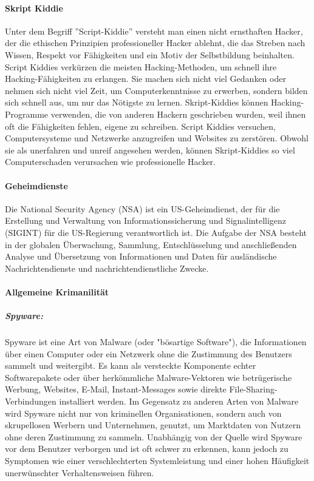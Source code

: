 \paragraph{Skript Kiddie}\mbox{}

Unter dem Begriff ''Script-Kiddie'' versteht man einen nicht ernsthaften Hacker, der die ethischen Prinzipien professioneller Hacker ablehnt, die das Streben nach Wissen, Respekt vor Fähigkeiten und ein Motiv der Selbstbildung beinhalten. Script Kiddies verkürzen die meisten Hacking-Methoden, um schnell ihre Hacking-Fähigkeiten zu erlangen. Sie machen sich nicht viel Gedanken oder nehmen sich nicht viel Zeit, um Computerkenntnisse zu erwerben, sondern bilden sich schnell aus, um nur das Nötigste zu lernen. Skript-Kiddies können Hacking-Programme verwenden, die von anderen Hackern geschrieben wurden, weil ihnen oft die Fähigkeiten fehlen, eigene zu schreiben. Script Kiddies versuchen, Computersysteme und Netzwerke anzugreifen und Websites zu zerstören. Obwohl sie als unerfahren und unreif angesehen werden, können Skript-Kiddies so viel Computerschaden verursachen wie professionelle Hacker\cite{scriptkiddie11}.

\paragraph{Geheimdienste}\mbox{}

Die National Security Agency (NSA) ist ein US-Geheimdienst, der für die Erstellung und Verwaltung von Informationssicherung und Signalintelligenz (SIGINT) für die US-Regierung verantwortlich ist. Die Aufgabe der NSA besteht in der globalen Überwachung, Sammlung, Entschlüsselung und anschließenden Analyse und Übersetzung von Informationen und Daten für ausländische Nachrichtendienste und nachrichtendienstliche Zwecke\cite{nsa14}.

\paragraph{Allgemeine Krimanilität}\mbox{}

\subparagraph{Spyware: }

Spyware ist eine Art von Malware (oder "bösartige Software"), die Informationen über einen Computer oder ein Netzwerk ohne die Zustimmung des Benutzers sammelt und weitergibt. Es kann als versteckte Komponente echter Softwarepakete oder über herkömmliche Malware-Vektoren wie betrügerische Werbung, Websites, E-Mail, Instant-Messages sowie direkte File-Sharing-Verbindungen installiert werden. Im Gegensatz zu anderen Arten von Malware wird Spyware nicht nur von kriminellen Organisationen, sondern auch von skrupellosen Werbern und Unternehmen, genutzt, um Marktdaten von Nutzern ohne deren Zustimmung zu sammeln. Unabhängig von der Quelle wird Spyware vor dem Benutzer verborgen und ist oft schwer zu erkennen, kann jedoch zu Symptomen wie einer verschlechterten Systemleistung und einer hohen Häufigkeit unerwünschter Verhaltensweisen führen\cite{spy12}.

